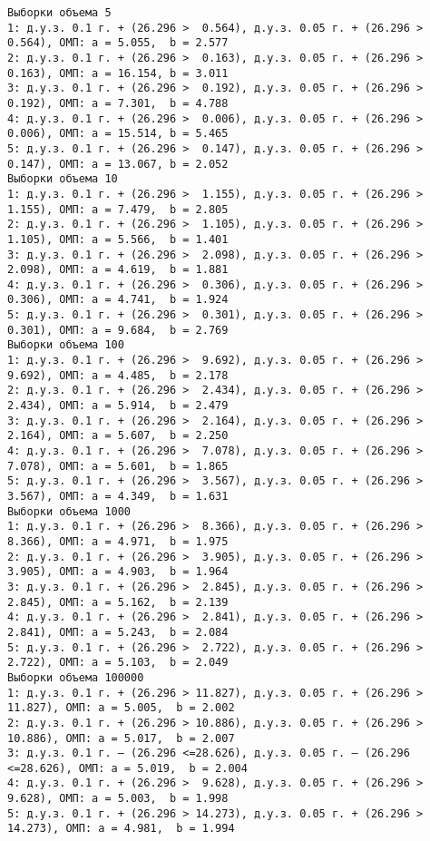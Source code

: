 \documentclass[11pt]{article}
\begin{document}
{\fontsize{7.8}{8}
    \begin{Verbatim}[commandchars=\\\{\}]
Выборки объема 5
1: д.у.з. 0.1 г. + (26.296 >  0.564), д.у.з. 0.05 г. + (26.296 >  0.564), ОМП: a = 5.055,  b = 2.577
2: д.у.з. 0.1 г. + (26.296 >  0.163), д.у.з. 0.05 г. + (26.296 >  0.163), ОМП: a = 16.154, b = 3.011
3: д.у.з. 0.1 г. + (26.296 >  0.192), д.у.з. 0.05 г. + (26.296 >  0.192), ОМП: a = 7.301,  b = 4.788
4: д.у.з. 0.1 г. + (26.296 >  0.006), д.у.з. 0.05 г. + (26.296 >  0.006), ОМП: a = 15.514, b = 5.465
5: д.у.з. 0.1 г. + (26.296 >  0.147), д.у.з. 0.05 г. + (26.296 >  0.147), ОМП: a = 13.067, b = 2.052
Выборки объема 10
1: д.у.з. 0.1 г. + (26.296 >  1.155), д.у.з. 0.05 г. + (26.296 >  1.155), ОМП: a = 7.479,  b = 2.805
2: д.у.з. 0.1 г. + (26.296 >  1.105), д.у.з. 0.05 г. + (26.296 >  1.105), ОМП: a = 5.566,  b = 1.401
3: д.у.з. 0.1 г. + (26.296 >  2.098), д.у.з. 0.05 г. + (26.296 >  2.098), ОМП: a = 4.619,  b = 1.881
4: д.у.з. 0.1 г. + (26.296 >  0.306), д.у.з. 0.05 г. + (26.296 >  0.306), ОМП: a = 4.741,  b = 1.924
5: д.у.з. 0.1 г. + (26.296 >  0.301), д.у.з. 0.05 г. + (26.296 >  0.301), ОМП: a = 9.684,  b = 2.769
Выборки объема 100
1: д.у.з. 0.1 г. + (26.296 >  9.692), д.у.з. 0.05 г. + (26.296 >  9.692), ОМП: a = 4.485,  b = 2.178
2: д.у.з. 0.1 г. + (26.296 >  2.434), д.у.з. 0.05 г. + (26.296 >  2.434), ОМП: a = 5.914,  b = 2.479
3: д.у.з. 0.1 г. + (26.296 >  2.164), д.у.з. 0.05 г. + (26.296 >  2.164), ОМП: a = 5.607,  b = 2.250
4: д.у.з. 0.1 г. + (26.296 >  7.078), д.у.з. 0.05 г. + (26.296 >  7.078), ОМП: a = 5.601,  b = 1.865
5: д.у.з. 0.1 г. + (26.296 >  3.567), д.у.з. 0.05 г. + (26.296 >  3.567), ОМП: a = 4.349,  b = 1.631
Выборки объема 1000
1: д.у.з. 0.1 г. + (26.296 >  8.366), д.у.з. 0.05 г. + (26.296 >  8.366), ОМП: a = 4.971,  b = 1.975
2: д.у.з. 0.1 г. + (26.296 >  3.905), д.у.з. 0.05 г. + (26.296 >  3.905), ОМП: a = 4.903,  b = 1.964
3: д.у.з. 0.1 г. + (26.296 >  2.845), д.у.з. 0.05 г. + (26.296 >  2.845), ОМП: a = 5.162,  b = 2.139
4: д.у.з. 0.1 г. + (26.296 >  2.841), д.у.з. 0.05 г. + (26.296 >  2.841), ОМП: a = 5.243,  b = 2.084
5: д.у.з. 0.1 г. + (26.296 >  2.722), д.у.з. 0.05 г. + (26.296 >  2.722), ОМП: a = 5.103,  b = 2.049
Выборки объема 100000
1: д.у.з. 0.1 г. + (26.296 > 11.827), д.у.з. 0.05 г. + (26.296 > 11.827), ОМП: a = 5.005,  b = 2.002
2: д.у.з. 0.1 г. + (26.296 > 10.886), д.у.з. 0.05 г. + (26.296 > 10.886), ОМП: a = 5.017,  b = 2.007
3: д.у.з. 0.1 г. – (26.296 <=28.626), д.у.з. 0.05 г. – (26.296 <=28.626), ОМП: a = 5.019,  b = 2.004
4: д.у.з. 0.1 г. + (26.296 >  9.628), д.у.з. 0.05 г. + (26.296 >  9.628), ОМП: a = 5.003,  b = 1.998
5: д.у.з. 0.1 г. + (26.296 > 14.273), д.у.з. 0.05 г. + (26.296 > 14.273), ОМП: a = 4.981,  b = 1.994
\end{Verbatim}
}
\end{document}
